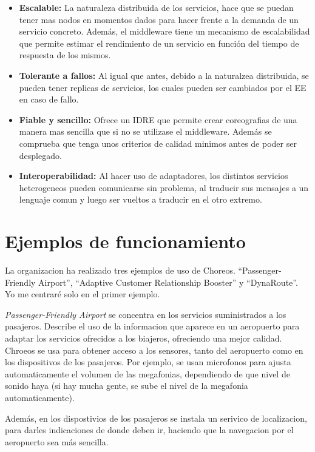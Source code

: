 \documentclass[runningheads]{llncs}
\begin{document}
\begin{itemize}
    \item \textbf{Escalable: }La naturaleza distribuida de los servicios, hace que se puedan tener mas nodos en momentos dados para hacer frente a la demanda de un servicio concreto. Además, el middleware tiene un mecanismo de escalabilidad que permite estimar el rendimiento de un servicio en función del tiempo de respuesta de los mismos.
    \item \textbf{Tolerante a fallos: }Al igual que antes, debido a la naturalzea distribuida, se pueden tener replicas de servicios, los cuales pueden ser cambiados por el EE en caso de fallo.
    \item \textbf{Fiable y sencillo: }Ofrece un IDRE que permite crear coreografias de una manera mas sencilla que si no se utilizase el middleware. Además se comprueba que tenga unos criterios de calidad minimos antes de poder ser desplegado.
    \item \textbf{Interoperabilidad: }Al hacer uso de adaptadores, los distintos servicios heterogeneos pueden comunicarse sin problema, al traducir sus mensajes a un lenguaje comun y luego ser vueltos a traducir en el otro extremo.~\cite{a_2}
\end{itemize}
\section{Ejemplos de funcionamiento}
La organizacion ha realizado tres ejemplos de uso de Choreos. ``Passenger-Friendly Airport'', ``Adaptive Customer Relationship Booster'' y ``DynaRoute''.~\cite{a_2} Yo me centraré solo en el primer ejemplo.

\textit{Passenger-Friendly Airport} se concentra en los servicios suministrados a los pasajeros. Describe el uso de la informacion que aparece en un aeropuerto para adaptar los servicios ofrecidos a los biajeros, ofreciendo una mejor calidad. Chroeos se usa para obtener acceso a los sensores, tanto del aeropuerto como en los dispositivos de los pasajeros. Por ejemplo, se usan microfonos para ajusta automaticamente el volumen de las megafonias, dependiendo de que nivel de sonido haya (si hay mucha gente, se sube el nivel de la megafonia automaticamente).~\cite{a_128}

Además, en los dispostivios de los pasajeros se instala un serivico de localizacion, para darles indicaciones de donde deben ir, haciendo que la navegacion por el aeropuerto sea más sencilla.~\cite{a_128}
\end{document}
